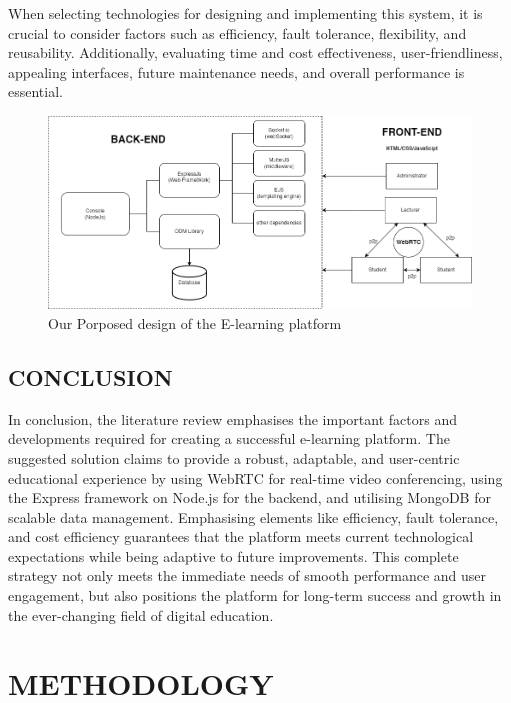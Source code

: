 \documentclass[a4paper,12pt]{article}  %
\begin{document}
When selecting technologies for designing and implementing this system, it is
crucial to consider factors such as efficiency, fault tolerance, flexibility,
and reusability. Additionally, evaluating time and cost effectiveness,
user-friendliness, appealing interfaces, future maintenance needs, and overall
performance is essential.\\

\begin{figure}[H]
      \centering
      \includegraphics[width=1\textwidth]{figures/proposed.png}
      \caption{Our Porposed design of the E-learning platform}
\end{figure}

\subsection{CONCLUSION}
In conclusion, the literature review emphasises the important factors and
developments required for creating a successful e-learning platform. The
suggested solution claims to provide a robust, adaptable, and user-centric
educational experience by using WebRTC for real-time video conferencing, using
the Express framework on Node.js for the backend, and utilising MongoDB for
scalable data management. Emphasising elements like efficiency, fault
tolerance, and cost efficiency guarantees that the platform meets current
technological expectations while being adaptive to future improvements. This
complete strategy not only meets the immediate needs of smooth performance and
user engagement, but also positions the platform for long-term success and
growth in the ever-changing field of digital education.\\ \newpage

\section{METHODOLOGY}
\end{document}
